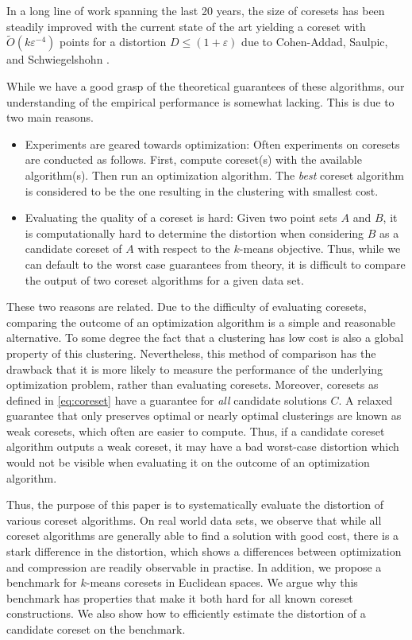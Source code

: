 In a long line of work spanning the last 20 years\cite{BecchettiBC0S19,BravermanJKW21,Chen09,FL11,FeldmanSS20,
HaM04,HaK07,huang2020coresets,BravermanJKW21,LS10,SohlerW18}, the size of coresets has been steadily improved with the current state of the art yielding a coreset with $\tilde{O}(k\varepsilon^{-4})$ points for a distortion $D\leq (1+\varepsilon)$ due to Cohen-Addad, Saulpic, and Schwiegelshohn \cite{Cohen-AddadSS21}.

While we have a good grasp of the theoretical guarantees of these algorithms, our understanding of the empirical performance is somewhat lacking.
This is due to two main reasons.
\begin{itemize}
\item Experiments are geared towards optimization: Often experiments on coresets are conducted as follows. First, compute coreset(s) with the available algorithm(s). Then run an optimization algorithm. The \emph{best} coreset algorithm is considered to be the one resulting in the clustering with smallest cost. 
\item Evaluating the quality of a coreset is hard: Given two point sets $A$ and $B$, it is computationally hard to determine the distortion when considering $B$ as a candidate coreset of $A$ with respect to the $k$-means objective.  Thus, while we can default to the worst case guarantees from theory, it is difficult to compare the output of two coreset algorithms for a given data set. 
\end{itemize}

These two reasons are related. Due to the difficulty of evaluating coresets, comparing the outcome of an optimization algorithm is a simple and reasonable alternative. To some degree the fact that a clustering has low cost is also a global property of this clustering.
Nevertheless, this method of comparison has the drawback that it is more likely to measure the performance of the underlying optimization problem, rather than evaluating coresets. Moreover, coresets as defined in \cref{eq:coreset} have a guarantee for \emph{all} candidate solutions $C$. A relaxed guarantee that only preserves optimal or nearly optimal clusterings are known as weak coresets, which often are easier to compute. Thus, if a candidate coreset algorithm outputs a weak coreset, it may have a bad worst-case distortion which would not be visible when evaluating it on the outcome of an optimization algorithm.

Thus, the purpose of this paper is to systematically evaluate the distortion of various coreset algorithms.
On real world data sets, we observe that while all coreset algorithms are generally able to find a solution with good cost, there is a stark difference in the distortion, which shows a differences between optimization and compression are readily observable in practise.
In addition, we propose a benchmark for $k$-means coresets in Euclidean spaces.
We argue why this benchmark has properties that make it both hard for all known coreset constructions. We also show how to efficiently estimate the distortion of a candidate coreset on the benchmark.
